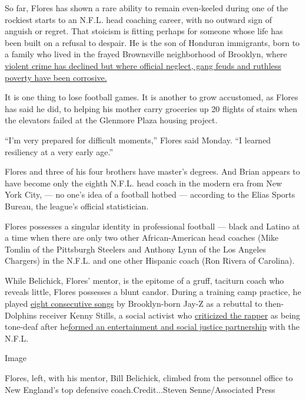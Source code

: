So far, Flores has shown a rare ability to remain even-keeled during one
of the rockiest starts to an N.F.L. head coaching career, with no
outward sign of anguish or regret. That stoicism is fitting perhaps for
someone whose life has been built on a refusal to despair. He is the son
of Honduran immigrants, born to a family who lived in the frayed
Brownsville neighborhood of Brooklyn, where
\href{https://www.nytimes3xbfgragh.onion/2019/07/28/nyregion/brooklyn-shooting-brownsville-park.html}{violent
crime has declined but where official neglect, gang feuds and ruthless
poverty have been corrosive.}

It is one thing to lose football games. It is another to grow
accustomed, as Flores has said he did, to helping his mother carry
groceries up 20 flights of stairs when the elevators failed at the
Glenmore Plaza housing project.

``I'm very prepared for difficult moments,'' Flores said Monday. ``I
learned resiliency at a very early age.''

Flores and three of his four brothers have master's degrees. And Brian
appears to have become only the eighth N.F.L. head coach in the modern
era from New York City, --- no one's idea of a football hotbed ---
according to the Elias Sports Bureau, the league's official
statistician.

Flores possesses a singular identity in professional football --- black
and Latino at a time when there are only two other African-American head
coaches (Mike Tomlin of the Pittsburgh Steelers and Anthony Lynn of the
Los Angeles Chargers) in the N.F.L. and one other Hispanic coach (Ron
Rivera of Carolina).

While Belichick, Flores' mentor, is the epitome of a gruff, taciturn
coach who reveals little, Flores possesses a blunt candor. During a
training camp practice, he played
\href{https://ftw.usatoday.com/2019/08/dolphins-coach-brian-flores-kenny-stills-8-jay-z-songs-practice}{eight
consecutive songs} by Brooklyn-born Jay-Z as a rebuttal to then-Dolphins
receiver Kenny Stills, a social activist who
\href{https://www.si.com/nfl/2019/08/19/kenny-stills-criticizes-jay-z-nfl-partnership-dolphins}{criticized
the rapper} as being tone-deaf after
he\href{https://www.nytimes3xbfgragh.onion/2019/08/13/sports/nfl-jay-z.html}{formed
an entertainment and social justice partnership} with the N.F.L.

Image

Flores, left, with his mentor, Bill Belichick, climbed from the
personnel office to New England's top defensive coach.Credit...Steven
Senne/Associated Press

